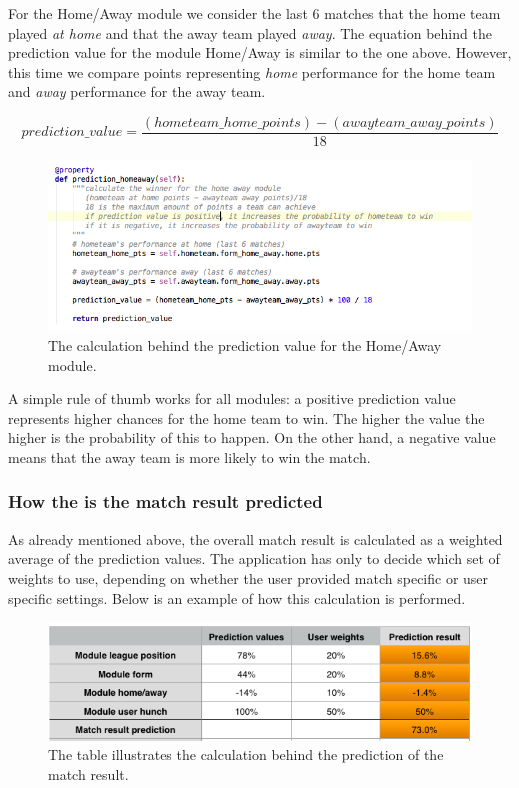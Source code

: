 For the Home/Away module we consider the last 6 matches that the home team played \emph{at home} and that the away team played \emph{away}. The equation behind the prediction value for the module Home/Away is similar to the one above. However, this time we compare points representing \emph{home} performance for the home team and \emph{away} performance for the away team.

\begin{equation}
  prediction\_value = \frac{(hometeam\_home\_points)-(awayteam\_away\_points)}{18}
\end{equation}

\begin{figure}[H]
	\begin{center}
		\includegraphics[width=.80\textwidth]{impl/images/predictionHomeAway}
		\caption{The calculation behind the prediction value for the Home/Away module.} \label{fig:using: predictionhomeaway}
	\end{center}
\end{figure}

A simple rule of thumb works for all modules: a positive prediction value represents higher chances for the home team to win. The higher the value the higher is the probability of this to happen. On the other hand, a negative value means that the away team is more likely to win the match.

\subsubsection*{How the is the match result predicted}
As already mentioned above, the overall match result is calculated as a weighted average of the prediction values. The application has only to decide which set of weights to use, depending on whether the user provided match specific or user specific settings. Below is an example of how this calculation is performed.

\begin{figure}[H]
	\begin{center}
		\includegraphics[width=.80\textwidth]{impl/images/overallPredictionCalculation}
		\caption{The table illustrates the calculation behind the prediction of the match result.} \label{fig:using: overallpredictioncalculation}
	\end{center}
\end{figure}

